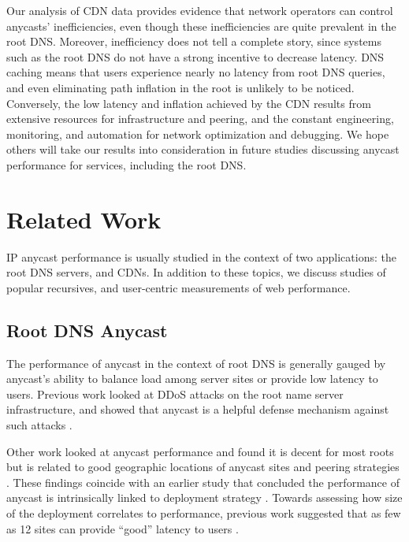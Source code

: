 \documentclass[sigconf,letterpaper,nonacm,10pt,anonymous]{acmart}
\begin{document}
Our analysis of CDN data provides evidence that network operators can
control anycasts' inefficiencies, even though these inefficiencies are
quite prevalent in the root DNS. Moreover, inefficiency does not tell a
complete story, since systems such as the root DNS do not have a strong
incentive to decrease latency. DNS caching means that users experience
nearly no latency from root DNS queries, and even eliminating path
inflation in the root is unlikely to be noticed. Conversely, the low
latency and inflation achieved by the CDN results from extensive
resources for infrastructure and peering, and the constant engineering,
monitoring, and automation for network optimization and debugging. We
hope others will take our results into consideration in future studies
discussing anycast performance for services, including the root DNS.

\section{Related Work}\label{related-work-1}

\label{sec:related}

IP anycast performance is usually studied in the context of two
applications: the root DNS servers, and CDNs. In addition to these
topics, we discuss studies of popular recursives, and user-centric
measurements of web performance.

\subsection{Root DNS Anycast}\label{root-dns-anycast-2}

\label{sec:related_root_dns_anycast}

The performance of anycast in the context of root DNS is generally
gauged by anycast's ability to balance load among server sites or
provide low latency to users. Previous work looked at DDoS attacks on
the root name server infrastructure, and showed that anycast is a
helpful defense mechanism against such attacks
\cite{sarat2006use, moura2016anycast}.

Other work looked at anycast performance and found it is decent for most
roots \cite{sarat2006use} but is related to good geographic locations of
anycast sites and peering strategies \cite{de2017anycast}. These
findings coincide with an earlier study that concluded the performance
of anycast is intrinsically linked to deployment strategy
\cite{ballani2006measurement}. Towards assessing how size of the
deployment correlates to performance, previous work suggested that as
few as 12 sites can provide ``good'' latency to users
\cite{de2017anycast}.
\end{document}
